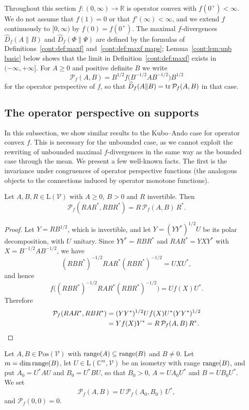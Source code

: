 Throughout this section $f:(0,\infty)\to\mathbb{R}$ is operator convex with $f(0^+)<\infty$. We do not assume that $f(1)=0$ or that $f'(\infty)<\infty$, and we extend $f$ continuously to $[0,\infty)$ by $f(0)=f(0^+)$. The maximal $f$-divergences $\widehat{D}_f(A\|B)$ and $\widehat{D}_f(\Phi\|\Psi)$ are defined by the formulas of Definitions~\ref{cont:def:maxf} and~\ref{cont:def:maxf maps}; Lemma~\ref{cont:lem:unb basic} below shows that the limit in Definition~\ref{cont:def:maxf} exists in $(-\infty,+\infty]$. For $A\geq0$ and positive definite $B$ we write
\[
\mathcal{P}_f(A,B)=B^{1/2}f\big(B^{-1/2}AB^{-1/2}\big)B^{1/2}
\]
for the operator perspective of $f$, so that $\widehat{D}_f(A\|B)=\operatorname{tr}\mathcal{P}_f(A,B)$ in that case.

\subsection{The operator perspective on supports}
In this subsection, we show similar results to the Kubo--Ando case for operator convex $f$. This is necessary for the unbounded case, as we cannot exploit the rewriting of unbounded maximal $f$-divergences in the same way as the bounded case through the mean. We present a few well-known facts. The first is the invariance under congruences of operator perspective functions (the analogous objects to the connections induced by operator monotone functions).
\begin{lemma}\label{cont:lem:unb congruence pd}
Let $A,B,R\in\mathrm{L}(\mathcal{V})$ with $A\geq0$, $B>0$ and $R$ invertible. Then
\[
\mathcal{P}_f(RAR^*,RBR^*)=R\,\mathcal{P}_f(A,B)\,R^*.
\]
\end{lemma}

\begin{proof}
Let $Y=RB^{1/2}$, which is invertible, and let $Y=(YY^*)^{1/2}U$ be its polar decomposition, with $U$ unitary. Since $YY^*=RBR^*$ and $RAR^*=YXY^*$ with $X=B^{-1/2}AB^{-1/2}$, we have
\[
(RBR^*)^{-1/2}RAR^*(RBR^*)^{-1/2}=UXU^*,
\]
and hence
\[
f\big((RBR^*)^{-1/2}RAR^*(RBR^*)^{-1/2}\big)=Uf(X)U^*.
\]
Therefore
\begin{align*}
\mathcal{P}_f(RAR^*,RBR^*)&=(YY^*)^{1/2}Uf(X)U^*(YY^*)^{1/2}\\
&=Yf(X)Y^*=R\,\mathcal{P}_f(A,B)\,R^*.\qedhere
\end{align*}
\end{proof}

\begin{definition}\label{cont:def:unb perspective}
Let $A,B\in\mathrm{Pos}(\mathcal{V})$ with $\operatorname{range}(A)\subseteq\operatorname{range}(B)$ and $B\neq0$. Let $m=\dim\operatorname{range}(B)$, let $U\in\mathrm{L}(\mathbb{C}^m,\mathcal{V})$ be an isometry with range $\operatorname{range}(B)$, and put $A_0=U^*AU$ and $B_0=U^*BU$, so that $B_0>0$, $A=UA_0U^*$ and $B=UB_0U^*$. We set
\[
\mathcal{P}_f(A,B)=U\,\mathcal{P}_f(A_0,B_0)\,U^*,
\]
and $\mathcal{P}_f(0,0)=0$.
\end{definition}

